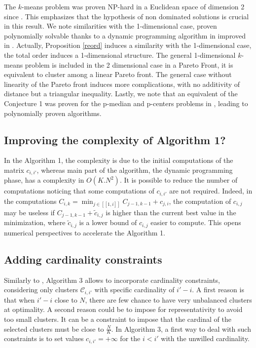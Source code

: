 \documentclass{meta}
\def\CC{{\mathcal{C}}}
\begin{document}
The $k$-means problem was proven 
NP-hard in a Euclidean space of dimension 2 since \cite{mahajan2012planar}. 
This emphasizes that the hypothesis of non dominated solutions is crucial in this result.
We note similarities with the 1-dimensional case, proven polynomially solvable thanks to
 a  dynamic programming algorithm in \cite{wang2011ckmeans} improved in \cite{gronlund2017fast}.
Actually, Proposition \ref{reord} induces a similarity with the  1-dimensional case,
the total order induces a 1-dimensional structure.
The general 1-dimensional  $k$-means problem is included in the  2 dimensional case in a Pareto Front,
it is equivalent to cluster among a linear  Pareto front.
The general case without linearity of the Pareto front induces more complications, with no additivity of distance but a triangular inequality.
Lastly, we note that an equivalent of the Conjecture 1 was proven
for the p-median and p-centers problems in  \cite{dupin2018clustering}, leading to polynomially proven algorithms.


\subsection{Improving the complexity of Algorithm 1?}
In the Algorithm 1, the complexity is due to the initial computations of the matrix $c_{i,i'}$,
whereas main part of the algorithm, the dynamic programming phase, has a complexity in $O(K.N^2)$. %
It is possible to reduce the number of computations noticing
that some computations of $c_{i,i'}$ are not required.
Indeed, in the computations $C_{i,k} = \min_{j \in [\![1,i]\!]} C_{j-1,k-1} + c_{j,i}$,
the computation of $c_{i,j}$ may be useless if $C_{j-1,k-1} + \tilde{c}_{i,j}$ is higher than the current best value in the minimization,
where $\tilde{c}_{i,j}$ is a lower bound of $c_{i,j}$ easier to compute.
This opens numerical perspectives to accelerate the Algorithm 1.



\subsection{Adding cardinality constraints}

Similarly to \cite{nielsen2014optimal}, Algorithm 3 allows to incorporate cardinality constraints, considering only clusters $\CC_{i,i'}$ with specific cardinality of $i'-i$.
A first reason is that when $i'-i$ close to $N$, there are few chance to have very unbalanced clusters at optimality.
A second reason could be to impose for representativity to avoid too small clusters.
It can be a constraint to impose that the cardinal of the selected clusters must be close to $\frac N K$.
In Algorithm 3, a first way to deal with such constraints is to set values  $c_{i,i'} = + \infty$ for the  $i<i'$ with the unwilled cardinality.
\end{document}
